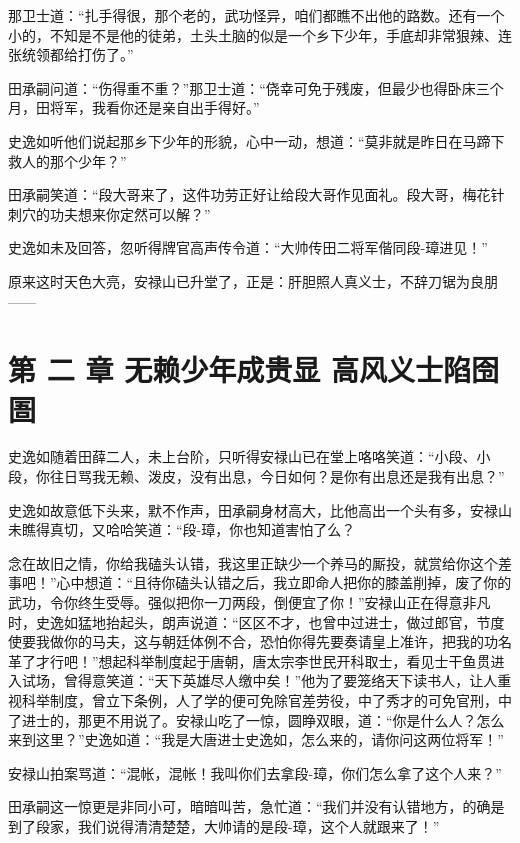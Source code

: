 \documentclass[12pt,oneside]{book}
\begin{document}
那卫士道：``扎手得很，那个老的，武功怪异，咱们都瞧不出他的路数。还有一个小的，不知是不是他的徒弟，土头土脑的似是一个乡下少年，手底却非常狠辣、连张统领都给打伤了。''

田承嗣问道：``伤得重不重？''那卫士道：``侥幸可免于残废，但最少也得卧床三个月，田将军，我看你还是亲自出手得好。''

史逸如听他们说起那乡下少年的形貌，心中一动，想道：``莫非就是昨日在马蹄下救人的那个少年？''

田承嗣笑道：``段大哥来了，这件功劳正好让给段大哥作见面礼。段大哥，梅花针刺穴的功夫想来你定然可以解？''

史逸如未及回答，忽听得牌官高声传令道：``大帅传田二将军偕同段-璋进见！''

原来这时天色大亮，安禄山已升堂了，正是：肝胆照人真义士，不辞刀锯为良朋------

\chapter{第 二 章 无赖少年成贵显
高风义士陷囹圄}\label{ux7b2c-ux4e8c-ux7ae0-ux65e0ux8d56ux5c11ux5e74ux6210ux8d35ux663e-ux9ad8ux98ceux4e49ux58ebux9677ux56f9ux5704}

史逸如随着田薛二人，未上台阶，只听得安禄山已在堂上咯咯笑道：``小段、小段，你往日骂我无赖、泼皮，没有出息，今日如何？是你有出息还是我有出息？''

史逸如故意低下头来，默不作声，田承嗣身材高大，比他高出一个头有多，安禄山未瞧得真切，又哈哈笑道：``段-璋，你也知道害怕了么？

念在故旧之情，你给我磕头认错，我这里正缺少一个养马的厮投，就赏给你这个差事吧！''心中想道：``且待你磕头认错之后，我立即命人把你的膝盖削掉，废了你的武功，令你终生受辱。强似把你一刀两段，倒便宜了你！''安禄山正在得意非凡时，史逸如猛地抬起头，朗声说道：``区区不才，也曾中过进士，做过郎官，节度使要我做你的马夫，这与朝廷体例不合，恐怕你得先要奏请皇上准许，把我的功名革了才行吧！''想起科举制度起于唐朝，唐太宗李世民开科取士，看见士干鱼贯进入试场，曾得意笑道：``天下英雄尽人缴中矣！''他为了要笼络天下读书人，让人重视科举制度，曾立下条例，人了学的便可免除官差劳役，中了秀才的可免官刑，中了进士的，那更不用说了。安禄山吃了一惊，圆睁双眼，道：``你是什么人？怎么来到这里？''史逸如道：``我是大唐进士史逸如，怎么来的，请你问这两位将军！''

安禄山拍案骂道：``混帐，混帐！我叫你们去拿段-璋，你们怎么拿了这个人来？''

田承嗣这一惊更是非同小可，暗暗叫苦，急忙道：``我们并没有认错地方，的确是到了段家，我们说得清清楚楚，大帅请的是段-璋，这个人就跟来了！''
\end{document}

